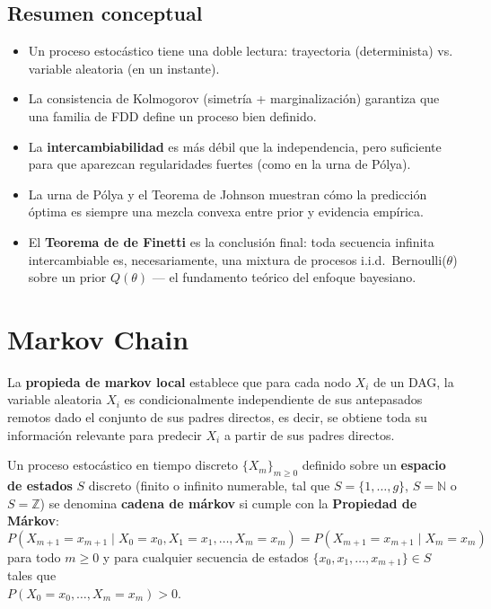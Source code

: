 \documentclass[10pt]{book}
\newcommand{\tbf}{\textbf}
\begin{document}
\section{Resumen conceptual}
 
\begin{itemize}
    \item Un proceso estocástico tiene una doble lectura: trayectoria (determinista) vs. variable aleatoria (en un instante).
    \item La consistencia de Kolmogorov (simetría + marginalización) garantiza que una familia de FDD define un proceso bien definido.
    \item La \textbf{intercambiabilidad} es más débil que la independencia, pero suficiente para que aparezcan regularidades fuertes (como en la urna de Pólya).
    \item La urna de Pólya y el Teorema de Johnson muestran cómo la predicción óptima es siempre una mezcla convexa entre prior y evidencia empírica.
    \item El \textbf{Teorema de de Finetti} es la conclusión final: toda secuencia infinita intercambiable es, necesariamente, una mixtura de procesos i.i.d.\ Bernoulli($\theta$) sobre un prior $Q(\theta)$ — el fundamento teórico del enfoque bayesiano.
\end{itemize}

\chapter{Markov Chain}


\begin{definicion}
    La \tbf{propieda de markov local} establece que para cada nodo $X_i$ de un DAG, la variable aleatoria $X_i$ es condicionalmente independiente de sus antepasados remotos dado el conjunto de sus padres directos, es decir, se obtiene toda su información relevante para predecir $X_i$ a partir de sus padres directos.
\end{definicion}


\begin{definicion}
    Un proceso estocástico en tiempo discreto $\{X_m\}_{m \geq 0}$ definido sobre un \textbf{espacio de estados} $S$ discreto (finito o infinito numerable, tal que $S = \{1, \dots, g\}$, $S = \mathbb{N}$ o $S = \mathbb{Z}$) se denomina \textbf{cadena de márkov} si cumple con la \textbf{Propiedad de Márkov}:
    \begin{equation*}
        P(X_{m+1} = x_{m+1} \mid X_0 = x_0, X_1 = x_1, \dots, X_m = x_m) = P(X_{m+1} = x_{m+1} \mid X_m = x_m)
    \end{equation*}
    para todo $m \geq 0$ y para cualquier secuencia de estados $\{x_0, x_1, \dots, x_{m+1}\} \in S$ tales que \\ \mbox{$P(X_0 = x_0, \dots, X_m = x_m) > 0$}.
\end{definicion}
\end{document}

